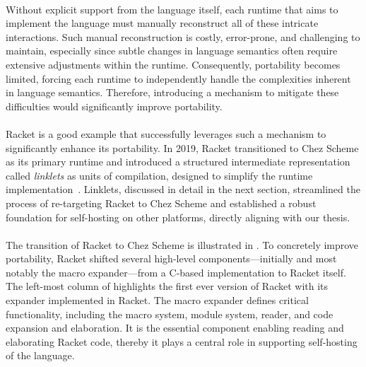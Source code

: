 		\paragraph{}%
			Without explicit support from the language itself, each runtime that aims to implement the language must manually reconstruct all of these intricate interactions. Such manual reconstruction is costly, error-prone, and challenging to maintain, especially since subtle changes in language semantics often require extensive adjustments within the runtime. Consequently, portability becomes limited, forcing each runtime to independently handle the complexities inherent in language semantics. Therefore, introducing a mechanism to mitigate these difficulties would significantly improve portability.

		\paragraph{}%
			Racket is a good example that successfully leverages such a mechanism to significantly enhance its portability. In 2019, Racket transitioned to Chez Scheme as its primary runtime and introduced a structured intermediate representation called \emph{linklets} as units of compilation, designed to simplify the runtime implementation~\cite{icfp2019}. Linklets, discussed in detail in the next section, streamlined the process of re-targeting Racket to Chez Scheme and established a robust foundation for self-hosting on other platforms, directly aligning with our thesis.


		\paragraph{}%
			The transition of Racket to Chez Scheme is illustrated in . To concretely improve portability, Racket shifted several high-level components—initially and most notably the macro expander—from a C-based implementation to Racket itself. The left-most column of  highlights the first ever version of Racket with its expander implemented in Racket. The macro expander defines critical functionality, including the macro system, module system, reader, and code expansion and elaboration. It is the essential component enabling reading and elaborating Racket code, thereby it plays a central role in supporting self-hosting of the language.

